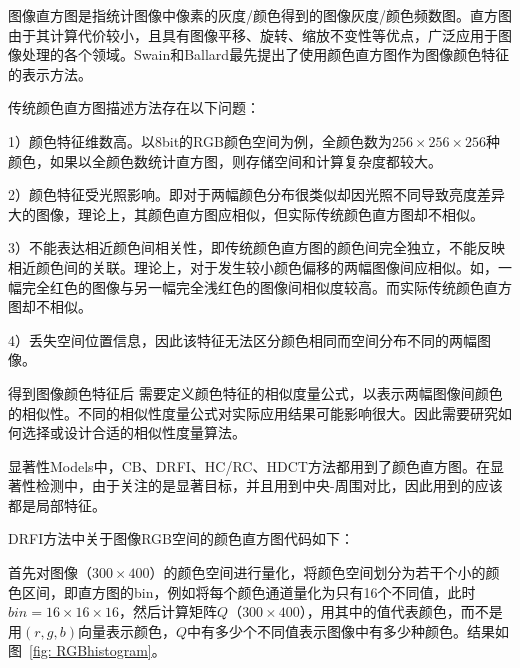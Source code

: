 \documentclass[12pt]{article}
\begin{document}
图像直方图是指统计图像中像素的灰度/颜色得到的图像灰度/颜色频数图。直方图由于其计算代价较小，且具有图像平移、旋转、缩放不变性等优点，广泛应用于图像处理的各个领域。Swain和Ballard最先提出了使用颜色直方图作为图像颜色特征的表示方法。

传统颜色直方图描述方法存在以下问题：

1）颜色特征维数高。以8bit的RGB颜色空间为例，全颜色数为$256 \times 256 \times 256$种颜色，如果以全颜色数统计直方图，则存储空间和计算复杂度都较大。

2）颜色特征受光照影响。即对于两幅颜色分布很类似却因光照不同导致亮度差异大的图像，理论上，其颜色直方图应相似，但实际传统颜色直方图却不相似。

3）不能表达相近颜色间相关性，即传统颜色直方图的颜色间完全独立，不能反映相近颜色间的关联。理论上，对于发生较小颜色偏移的两幅图像间应相似。如，一幅完全红色的图像与另一幅完全浅红色的图像间相似度较高。而实际传统颜色直方图却不相似。

4）丢失空间位置信息，因此该特征无法区分颜色相同而空间分布不同的两幅图像。

得到图像颜色特征后 需要定义颜色特征的相似度量公式，以表示两幅图像间颜色的相似性。不同的相似性度量公式对实际应用结果可能影响很大。因此需要研究如何选择或设计合适的相似性度量算法。

显著性Models中，CB、DRFI、HC/RC、HDCT方法都用到了颜色直方图。在显著性检测中，由于关注的是显著目标，并且用到中央-周围对比，因此用到的应该都是局部特征。

DRFI方法中关于图像RGB空间的颜色直方图代码如下：



首先对图像（$300 \times 400$）的颜色空间进行量化，将颜色空间划分为若干个小的颜色区间，即直方图的bin，例如将每个颜色通道量化为只有16个不同值，此时$bin = 16 \times 16 \times 16$，然后计算矩阵$Q$（$300 \times 400$），用其中的值代表颜色，而不是用$(r, g, b)$向量表示颜色，$Q$中有多少个不同值表示图像中有多少种颜色。结果如图~\ref{fig: RGBhistogram}。
\end{document}
